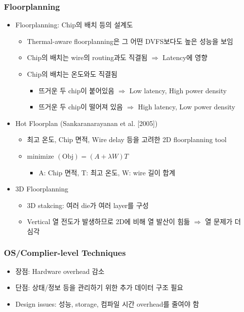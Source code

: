 \subsubsection*{Floorplanning}
\begin{itemize}
    \item Floorplanning: Chip의 배치 등의 설계도
    \begin{itemize}
        \item Thermal-aware floorplanning은 그 어떤 DVFS보다도 높은 성능을 보임
        \item Chip의 배치는 wire의 routing과도 직결됨 $\Rightarrow$ Latency에 영향
        \item Chip의 배치는 온도와도 직결됨
        \begin{itemize}
            \item 뜨거운 두 chip이 붙어있음 $\Rightarrow$ Low latency, High power density
            \item 뜨거운 두 chip이 떨어져 있음 $\Rightarrow$ High latency, Low power density
        \end{itemize}
    \end{itemize}
    \item Hot Floorplan (Sankaranarayanan et al. [2005])
    \begin{itemize}
        \item 최고 온도, Chip 면적, Wire delay 등을 고려한 2D floorplanning tool
        \item minimize $(\mathrm{Obj}) = (A + \lambda W)T$
        \begin{itemize}
            \item A: Chip 면적, T: 최고 온도, W: wire 길이 합계
        \end{itemize}
    \end{itemize}
    \item 3D Floorplanning
    \begin{itemize}
        \item 3D stakcing: 여러 die가 여러 layer를 구성
        \item Vertical 열 전도가 발생하므로 2D에 비해 열 발산이 힘듦 $\Rightarrow$ 열 문제가 더 심각
    \end{itemize}
\end{itemize}

\subsubsection*{OS/Complier-level Techniques}
\begin{itemize}
    \item 장점: Hardware overhead 감소
    \item 단점: 상태/정보 등을 관리하기 위한 추가 데이터 구조 필요
    \item Design issues: 성능, storage, 컴파일 시간 overhead를 줄여야 함
\end{itemize}
\newpage


